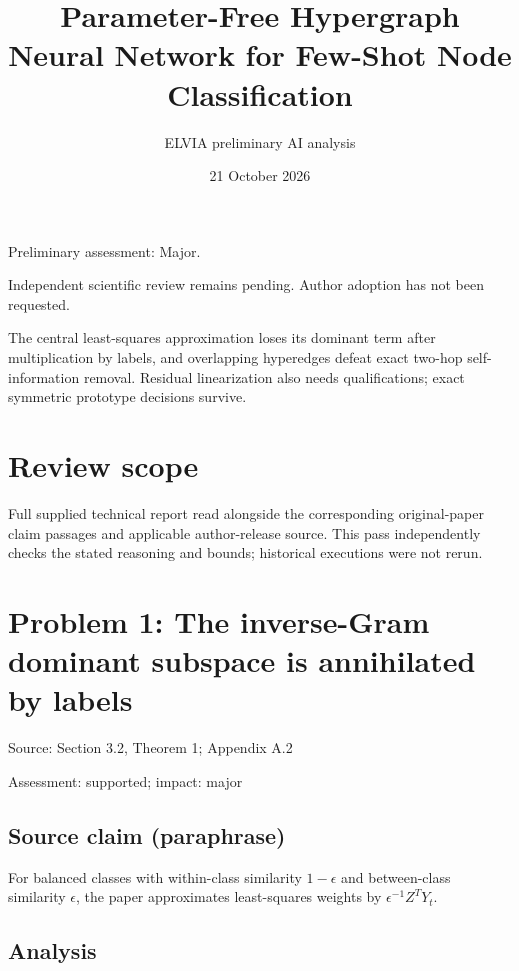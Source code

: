 \documentclass[11pt]{article}
\begin{document}
\title{Parameter-Free Hypergraph Neural Network for Few-Shot Node Classification}

\author{ELVIA preliminary AI analysis}\date{21 October 2026}\maketitle

Preliminary assessment: Major.\par

Independent scientific review remains pending. Author adoption has not been requested.

The central least-squares approximation loses its dominant term after multiplication by labels, and overlapping hyperedges defeat exact two-hop self-information removal. Residual linearization also needs qualifications; exact symmetric prototype decisions survive.

\section*{Review scope}

Full supplied technical report read alongside the corresponding original-paper claim passages and applicable author-release source. This pass independently checks the stated reasoning and bounds; historical executions were not rerun.

\section*{Problem 1: The inverse-Gram dominant subspace is annihilated by labels}

Source: Section 3.2, Theorem 1; Appendix A.2

Assessment: supported; impact: major

\subsection*{Source claim (paraphrase)}

For balanced classes with within-class similarity \(1-\epsilon\) and between-class similarity \(\epsilon\), the paper approximates least-squares weights by \(\epsilon^{-1}Z^TY_t\).

\subsection*{Analysis}
\end{document}
